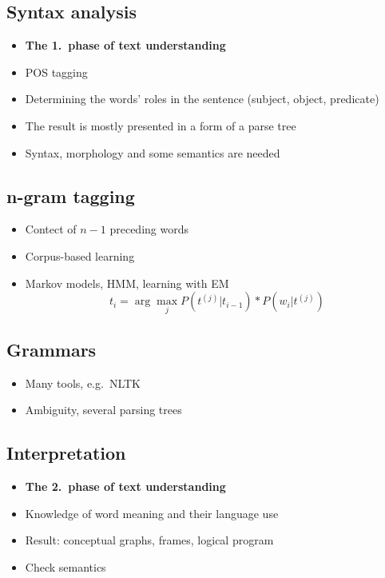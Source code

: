 \documentclass{article}
\begin{document}
    \subsection{Syntax analysis}
    \begin{itemize}
        \item \textbf{The 1.\ phase of text understanding}
        \item POS tagging
        \item Determining the words' roles in the sentence (subject, object, predicate)
        \item The result is mostly presented in a form of a parse tree
        \item Syntax, morphology and some semantics are needed
    \end{itemize}

    \subsection{n-gram tagging}
    \begin{itemize}
        \item Contect of $n-1$ preceding words
        \item Corpus-based learning
        \item Markov models, HMM, learning with EM
        \[ t_i = \arg\max_j P(t^{(j)} \vert t_{i-1}) * P(w_i \vert t^{(j)}) \]
    \end{itemize}

    \subsection{Grammars}
    \begin{itemize}
        \item Many tools, e.g.\ NLTK
        \item Ambiguity, several parsing trees
    \end{itemize}

    \subsection{Interpretation}
    \begin{itemize}
        \item \textbf{The 2.\ phase of text understanding}
        \item Knowledge of word meaning and their language use
        \item Result: conceptual graphs, frames, logical program
        \item Check semantics
    \end{itemize}
\end{document}
